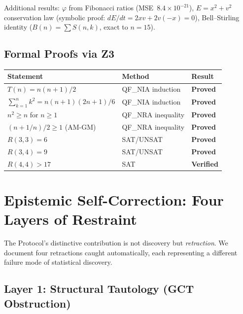 \documentclass[11pt,a4paper]{article}
\begin{document}
Additional results: $\varphi$ from Fibonacci ratios
(MSE~$8.4 \times 10^{-21}$),
$E = x^2 + v^2$ conservation law (symbolic proof: $dE/dt = 2xv + 2v(-x) = 0$),
Bell--Stirling identity ($B(n) = \sum S(n,k)$, exact to $n=15$).

\subsection{Formal Proofs via Z3}

\begin{center}
\begin{tabular}{lll}
  \toprule
  Statement & Method & Result \\
  \midrule
  $T(n) = n(n+1)/2$ & QF\_NIA induction & \textbf{Proved} \\
  $\sum_{k=1}^n k^2 = n(n+1)(2n+1)/6$ & QF\_NIA induction & \textbf{Proved} \\
  $n^2 \geq n$ for $n \geq 1$ & QF\_NRA inequality & \textbf{Proved} \\
  $(n + 1/n)/2 \geq 1$ (AM-GM) & QF\_NRA inequality & \textbf{Proved} \\
  $R(3,3) = 6$ & SAT/UNSAT & \textbf{Proved} \\
  $R(3,4) = 9$ & SAT/UNSAT & \textbf{Proved} \\
  $R(4,4) > 17$ & SAT & \textbf{Verified} \\
  \bottomrule
\end{tabular}
\end{center}





\section{Epistemic Self-Correction: Four Layers of Restraint}
\label{sec:selfcorrect}

The Protocol's distinctive contribution is not discovery but
\emph{retraction}. We document four retractions caught automatically,
each representing a different failure mode of statistical discovery.

\subsection{Layer 1: Structural Tautology (GCT Obstruction)}
\end{document}
